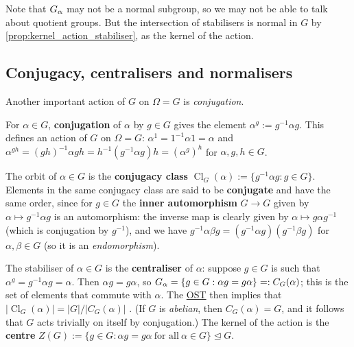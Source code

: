Note that $\added{2}{G_\alpha}$ may not be a normal subgroup, so we may not be able to talk about quotient groups. But the intersection of stabilisers is normal in $G$ by \autoref{prop:kernel_action_stabiliser}, as the kernel of the action.

\subsection{Conjugacy, centralisers and normalisers}

Another important action of $G$ on $\Omega = G$ is \textit{conjugation}. 

\begin{example}[conjugation]\label{eg:conjugation}
    For $\alpha \in G$, \textbf{conjugation} of $\alpha$ by $g \in G$ gives the element $\alpha^g := g^{-1}\alpha g$. This defines an action of $G$ on $\Omega = G$: $\alpha^1 = 1^{-1}\alpha 1 = \alpha$ and $\alpha^{gh} = (gh)^{-1}\alpha gh = h^{-1}(g^{-1}\alpha g)h = (\alpha^g)^h$ for $\alpha,g,h \in G$.

    The orbit of $\alpha \in G$ is the \textbf{conjugacy class} $\operatorname{Cl}_G(\alpha) := \{g^{-1}\alpha g : g \in G\}$. Elements in the same conjugacy class are said to be \textbf{conjugate} and have the same order, since for $g \in G$ the \textbf{inner automorphism} $G \to G$ given by $\alpha \mapsto g^{-1}\alpha g$ is an automorphism: the inverse map is clearly given by $\alpha \mapsto g\alpha g^{-1}$ (which is conjugation by $g^{-1}$), and we have $g^{-1}\alpha\beta g = (g^{-1}\alpha g)(g^{-1} \beta g)$ for $\alpha,\beta \in G$ (so it is an \textit{endomorphism}). 

    The stabiliser of $\alpha \in G$ is the \textbf{centraliser} of $\alpha$: suppose $g \in G$ is such that $\alpha^g = g^{-1}\alpha g = \alpha$. Then $\alpha g = g \alpha$, so $\added{2}{G_\alpha} = \{g \in G : \alpha g = g \alpha\} =: C_G(\alpha)$; this is the set of elements that commute with $\alpha$. The \hyperref[thm:orbit_stabiliser]{OST} then implies that $|\operatorname{Cl}_G(\alpha)| = |G|/|C_G(\alpha)|$ . (If $G$ is \textit{abelian}, then $C_G(\alpha) = G$, and it follows that $G$ acts trivially on itself by conjugation.) The kernel of the action is the \textbf{centre} $Z(G) := \{g \in G : \alpha g = g \alpha\ \text{for all}\ \alpha \in G\} \trianglelefteq G$.
\end{example}


